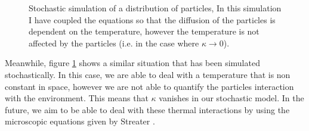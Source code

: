 \documentclass[11pt]{article} %
\begin{document}
\begin{figure}[tb]
	\centering
\quad
\caption{Stochastic simulation of a distribution of particles, In this simulation I have coupled the equations so that the diffusion of the particles is dependent on the temperature, however the temperature is not affected by the particles (i.e. in the case where $\kappa \to 0$).}
\label{fig:Stochastic}
\end{figure}

Meanwhile, figure \ref{fig:Stochastic} shows a similar situation that has been simulated stochastically. In this case, we  are able to deal with a temperature that is non constant in space, however we are not able to quantify the particles interaction with the environment. This means that $\kappa$ vanishes in our stochastic model. In the future, we aim to be able to deal with these thermal interactions by using the microscopic equations given by Streater \cite{Streater1997, Streater1997a}.







\clearpage{}   %
{} %


\end{document}
